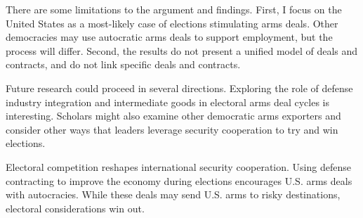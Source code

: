 \documentclass[12pt]{article}
\begin{document}
There are some limitations to the argument and findings.
First, I focus on the United States as a most-likely case of elections stimulating arms deals. 
Other democracies may use autocratic arms deals to support employment, but the process will differ. 
Second, the results do not present a unified model of deals and contracts, and do not link specific deals and contracts. 


Future research could proceed in several directions. 
Exploring the role of defense industry integration and intermediate goods in electoral arms deal cycles is interesting.
Scholars might also examine other democratic arms exporters and consider other ways that leaders leverage security cooperation to try and win elections. 


Electoral competition reshapes international security cooperation.
Using defense contracting to improve the economy during elections encourages U.S. arms deals with autocracies.
While these deals may send U.S. arms to risky destinations, electoral considerations win out. 


 
 
\end{document}
